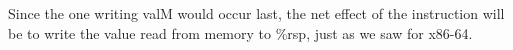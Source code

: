 \documentclass{article}
\begin{document}
Since the one writing valM would occur last, the net effect of the instruction
will be to write the value read from memory to \%rsp, just as we saw for x86-64.
\end{document}
